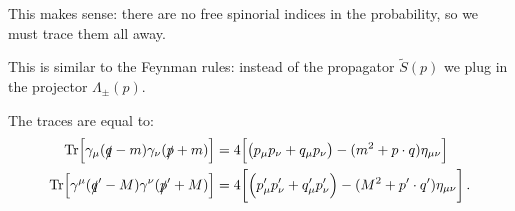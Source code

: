 \documentclass[main.tex]{subfiles}
\begin{document}
This makes sense: there are no free spinorial indices in the probability, so we must trace them all away. 


This is similar to the Feynman rules: instead of the propagator \(\widetilde{S}(p)\) we plug in the projector \(\Lambda_{\pm }(p)\). 

\begin{claim}
The traces are equal to: 
%
\begin{align} \label{eq:fermion-loop-trace-identity}
\Tr [\gamma_{\mu } (\slashed{q} - m) \gamma_{\nu } (\slashed{p} + m)] &= 
4 \qty[\qty(p_{\mu } p_{\nu } + q_{\mu } p_{\nu }) - (m^2 + p \cdot q) \eta_{\mu \nu}] \\
\Tr [\gamma^{\mu } (\slashed{q}' - M) \gamma^{\nu } (\slashed{p}' + M)] 
&= 4 \qty[\qty(p_{\mu }' p_{\nu }' + q_{\mu }' p_{\nu }') - (M^2 + p' \cdot q') \eta_{\mu \nu}] 
\,.
\end{align}
\end{claim}
\end{document}
